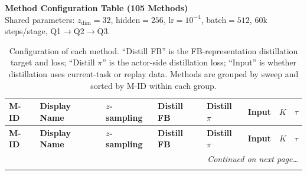 \documentclass[8pt,landscape]{extarticle}
\begin{document}
\begin{center}
{\Large\bfseries Method Configuration Table (105 Methods)}\\[4pt]
{\small Shared parameters: $z_{\mathrm{dim}}=32$, hidden$=256$, lr$=10^{-4}$, batch$=512$, 60k steps/stage, Q1$\to$Q2$\to$Q3.}
\end{center}

\vspace{4pt}

\setlength{\tabcolsep}{3pt}
\renewcommand{\arraystretch}{1.05}

\begin{longtable}{
  l                  %
  p{3.8cm}           %
  l                  %
  l                  %
  l                  %
  l                  %
  c                  %
  c                  %
}
\caption{Configuration of each method. ``Distill FB'' is the FB-representation distillation target and loss;
``Distill $\pi$'' is the actor-side distillation loss; ``Input'' is whether distillation uses current-task or replay data.
Methods are grouped by sweep and sorted by M-ID within each group.}\\
\toprule
\textbf{M-ID} & \textbf{Display Name} & \textbf{$z$-sampling} & \textbf{Distill FB} & \textbf{Distill $\pi$} & \textbf{Input} & \textbf{$K$} & \textbf{$\tau$} \\
\midrule
\endfirsthead
\toprule
\textbf{M-ID} & \textbf{Display Name} & \textbf{$z$-sampling} & \textbf{Distill FB} & \textbf{Distill $\pi$} & \textbf{Input} & \textbf{$K$} & \textbf{$\tau$} \\
\midrule
\endhead
\midrule
\multicolumn{8}{r}{\small\itshape Continued on next page\ldots}\\
\endfoot
\bottomrule
\endlastfoot


\end{longtable}
\end{document}
